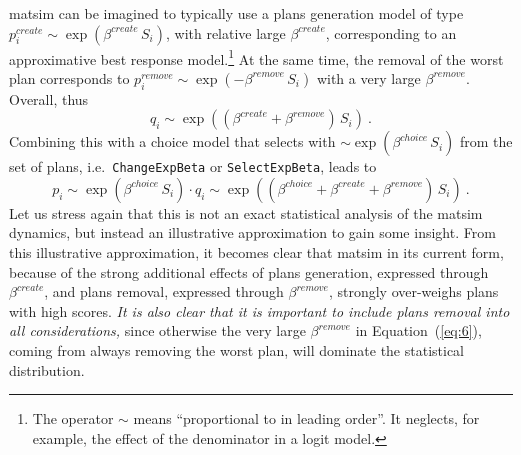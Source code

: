 \gls{matsim} can be imagined to typically use a plans generation model of type $p^{create}_i \sim \exp( \beta^{create}\, S_i )$, with relative large $\beta^{create}$, corresponding to an approximative best response model.\footnote{%
%
The operator $\sim$ means ``proportional to in leading order''.  It neglects, for example, the effect of the denominator in a logit model.
%
}
%
At the same time, the removal of the worst plan corresponds to $p^{remove}_i \sim \exp( - \beta^{remove} \, S_i)$ with a very large $\beta^{remove}$.  Overall, thus
\[
q_i \sim \exp( (\beta^{create}+ \beta^{remove}) \, S_i ) \ .
\]
Combining this with a choice model that selects with $\sim \exp( \beta^{choice} \, S_i )$ from the set of plans, i.e.\ \lstinline{ChangeExpBeta} or \lstinline{SelectExpBeta}, leads to
\begin{equation}
p_i \sim \exp( \beta^{choice} \, S_i) \cdot q_i
%
\sim \exp( (\beta^{choice} + \beta^{create}+ \beta^{remove}) \, S_i ) \ .
\label{eq:6}
\end{equation}
Let us stress again that this is not an exact statistical analysis of the \gls{matsim} dynamics, but instead an illustrative approximation to gain some insight.
%
From this illustrative approximation, it becomes clear that \gls{matsim} in its current form, because of the strong additional effects of plans generation, expressed through $\beta^{create}$, and plans removal, expressed through $\beta^{remove}$, 
strongly over-weighs plans with high scores.  \emph{It 
  is also clear that it is important to include plans removal into all considerations,} since otherwise the very large $\beta^{remove}$ in Equation~(\ref{eq:6}), coming from always removing the worst plan, will dominate the statistical distribution.




